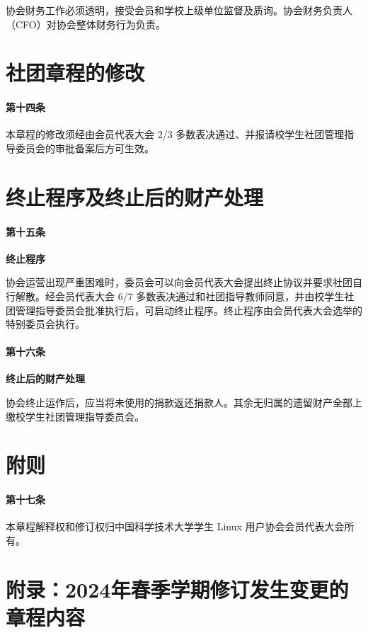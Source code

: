 \documentclass[a4paper, 12pt, twoside]{ctexart}
\begin{document}
	协会财务工作必须透明，接受会员和学校上级单位监督及质询。协会财务负责人（CFO）对协会整体财务行为负责。
	
	\section{社团章程的修改}
	
	\paragraph{第十四条} 本章程的修改须经由会员代表大会 2/3 多数表决通过、并报请校学生社团管理指导委员会的审批备案后方可生效。
	
	\section{终止程序及终止后的财产处理}
	
	\paragraph{第十五条} \textbf{终止程序}
	
	协会运营出现严重困难时，委员会可以向会员代表大会提出终止协议并要求社团自行解散。经会员代表大会 6/7 多数表决通过和社团指导教师同意，并由校学生社团管理指导委员会批准执行后，可启动终止程序。终止程序由会员代表大会选举的特别委员会执行。
	
	\paragraph{第十六条} \textbf{终止后的财产处理}
	
	协会终止运作后，应当将未使用的捐款返还捐款人。其余无归属的遗留财产全部上缴校学生社团管理指导委员会。
	
	\section{附则}
	
	\paragraph{第十七条} 本章程解释权和修订权归中国科学技术大学学生 Linux 用户协会会员代表大会所有。
	
	\newpage
	\section{附录：2024年春季学期修订发生变更的章程内容}
	
\end{document}
